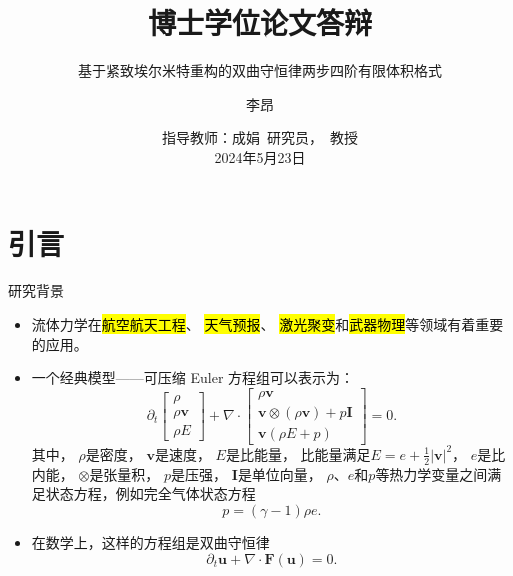 \documentclass[aspectratio=169]{beamer}
\begin{document}
\kai

\title[博士学位论文答辩]{博士学位论文答辩}
\subtitle{基于紧致埃尔米特重构的双曲守恒律两步四阶有限体积格式}
\author[李昂(中物院研究生院)]{李昂}
\date[24年5月]{
  指导教师：成娟~研究员，~教授\\[2mm]
  2024年5月23日
}

\maketitle
\outlineframe

\section{引言}

\begin{frame}{研究背景}
  
  \begin{itemize}[<+->]
    \item 流体力学在\hl{航空航天工程}、
          \hl{天气预报}、
          \hl{激光聚变}和\hl{武器物理}等领域有着重要的应用。
          
    \item 一个经典模型——可压缩 Euler 方程组可以表示为：
          \begin{equation*}
            {\partial_t}
            \begin{bmatrix} \rho \\ \rho {\bm v} \\ \rho E \end{bmatrix}
            +\nabla \cdot
            \begin{bmatrix} \rho {
              \bm v} \\ {\bm v} \otimes (\rho {\bm v})+ p \bm I \\ {\bm v}(\rho E+p)\end{bmatrix}
            = 0.
          \end{equation*}
          其中，
          $\rho$是密度，
          ${\bm v}$是速度，
          $E$是比能量，
          比能量满足$E = e + \frac{1}{2} |\bm v|^2$，
          $e$是比内能，
          $\otimes$是张量积，
          $p$是压强，
          $\bm I$是单位向量，
          $\rho$、$e$和$p$等热力学变量之间满足状态方程，例如完全气体状态方程
          $$p = (\gamma - 1) \rho e.$$
          
    \item 在数学上，这样的方程组是双曲守恒律
          $${\partial_t}{\bm u}+\nabla \cdot {\bm F}({\bm u}) = 0.$$
  \end{itemize}
  
\end{frame}
\end{document}
